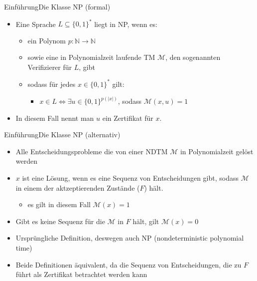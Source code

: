 \documentclass[ignorenonframetext,]{beamer}
\begin{document}
\begin{frame}{Einführung}{Die Klasse NP (formal)}

\begin{itemize}
\itemsep1pt\parskip0pt
\item
  Eine Sprache $L \subseteq \{0, 1\}^*$ liegt in NP, wenn es:

  \begin{itemize}
  \itemsep1pt\parskip0pt
  \item
    ein Polynom $p: \mathbb{N} \rightarrow \mathbb{N}$
  \item
    sowie eine in Polynomialzeit laufende TM $\mathcal{M}$, den
    sogenannten Verifizierer für $L$, gibt
  \item
    sodass für jedes $x \in \{0, 1\}^*$ gilt:

    \begin{itemize}
    \itemsep1pt\parskip0pt
    \item
      $x \in L \Leftrightarrow \exists u \in \{0, 1\}^{p(|x|)}$, sodass
      $\mathcal{M}(x, u) = 1$
    \end{itemize}
  \end{itemize}
\item
  In diesem Fall nennt man $u$ ein Zertifikat für $x$.
\end{itemize}

\end{frame}

\begin{frame}{Einführung}{Die Klasse NP (alternativ)}

\begin{itemize}
\itemsep1pt\parskip0pt
\item
  Alle Entscheidungsprobleme die von einer NDTM $\mathcal{M}$ in
  Polynomialzeit gelöst werden
\item
  $x$ ist eine Lösung, wenn es eine Sequenz von Entscheidungen gibt,
  sodass $\mathcal{M}$ in einem der aktzeptierenden Zustände ($F$) hält.

  \begin{itemize}
  \itemsep1pt\parskip0pt
  \item
    es gilt in diesem Fall $\mathcal{M}(x) = 1$
  \end{itemize}
\item
  Gibt es keine Sequenz für die $\mathcal{M}$ in $F$ hält, gilt
  $\mathcal{M}(x) = 0$
\item
  Ursprüngliche Definition, deswegen auch NP (nondeterministic
  polynomial time)
\item
  Beide Definitionen äquivalent, da die Sequenz von Entscheidungen, die
  zu $F$ führt als Zertifikat betrachtet werden kann
\end{itemize}

\end{frame}
\end{document}
